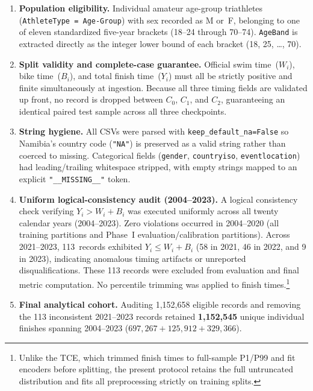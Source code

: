 \documentclass[11pt,a4paper]{article}
\begin{document}
\begin{enumerate}[leftmargin=*]
  \item \textbf{Population eligibility.} Individual amateur age-group
  triathletes (\texttt{AthleteType = Age-Group}) with sex recorded as
  M or~F, belonging to one of eleven standardized five-year brackets
  (18--24 through 70--74). \texttt{AgeBand} is extracted directly as
  the integer lower bound of each bracket (18, 25, \dots, 70).

  \item \textbf{Split validity and complete-case guarantee.} Official
  swim time~($W_i$), bike time~($B_i$), and total finish time~($Y_i$)
  must all be strictly positive and finite simultaneously at ingestion.
  Because all three timing fields are validated up front, no record is
  dropped between $C_0$, $C_1$, and $C_2$, guaranteeing an identical
  paired test sample across all three checkpoints.

  \item \textbf{String hygiene.} All CSVs were parsed with
  \texttt{keep\_default\_na=False} so Namibia's country code
  (\texttt{"NA"}) is preserved as a valid string rather than coerced to
  missing. Categorical fields (\texttt{gender}, \texttt{countryiso},
  \texttt{eventlocation}) had leading/trailing whitespace stripped,
  with empty strings mapped to an explicit \texttt{"\_\_MISSING\_\_"}
  token.

  \item \textbf{Uniform logical-consistency audit (2004--2023).} A
  logical consistency check verifying $Y_i > W_i + B_i$ was executed
  uniformly across all twenty calendar years (2004--2023). Zero
  violations occurred in 2004--2020 (all training partitions and
  Phase~I evaluation/calibration partitions). Across 2021--2023,
  113~records exhibited $Y_i \le W_i + B_i$ (58 in 2021, 46 in 2022,
  and 9 in 2023), indicating anomalous timing artifacts or unreported
  disqualifications. These 113 records were excluded from evaluation
  and final metric computation. No percentile trimming was applied to
  finish times.\footnote{Unlike the TCE, which trimmed finish times to
  full-sample P1/P99 and fit encoders before splitting, the present
  protocol retains the full untruncated distribution and fits all
  preprocessing strictly on training splits.}

  \item \textbf{Final analytical cohort.} Auditing 1{,}152{,}658
  eligible records and removing the 113 inconsistent 2021--2023 records
  retained \textbf{1{,}152{,}545} unique individual finishes spanning
  2004--2023 ($697{,}267 + 125{,}912 + 329{,}366$).
\end{enumerate}
\end{document}
